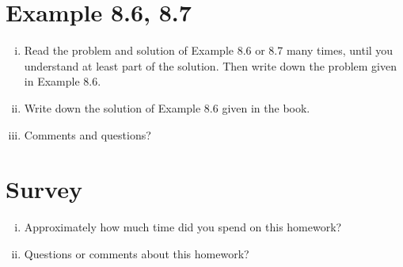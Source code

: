 \documentclass[10pt]{amsart}
\begin{document}
\section{Example 8.6, 8.7}

\begin{enumerate}[i.]
	\item Read the problem and solution of Example 8.6 or 8.7 many times, until you understand at least part of the solution. Then write down the problem given in Example 8.6.\\
	
	
	\item 
	Write down the solution of Example 8.6 given in the book.
	
	\item Comments and questions?
\end{enumerate}


%
%	
%	
%	



\section{Survey}
\begin{enumerate}[i.] 
\item Approximately how much time did you spend on this homework?
\item Questions or comments about this homework?
\end{enumerate}
\end{document}
